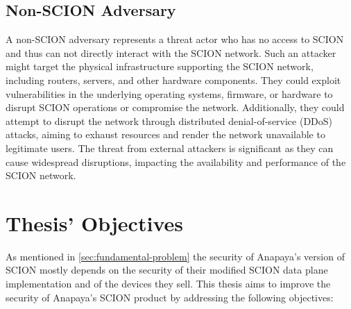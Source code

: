 \subsection{Non-SCION Adversary}
A non-SCION adversary represents a threat actor who has no access to SCION and thus can not directly interact with the SCION network.
Such an attacker might target the physical infrastructure supporting the SCION network, including routers, servers, and other hardware components.
They could exploit vulnerabilities in the underlying operating systems, firmware, or hardware to disrupt SCION operations or compromise the network.
Additionally, they could attempt to disrupt the network through distributed denial-of-service (DDoS) attacks, aiming to exhaust resources and render the network unavailable to legitimate users.
The threat from external attackers is significant as they can cause widespread disruptions, impacting the availability and performance of the SCION network.



\section{Thesis' Objectives}
As mentioned in \cref{sec:fundamental-problem} the security of Anapaya's version of SCION mostly depends on the security of their modified SCION data plane implementation and of the devices they sell.
This thesis aims to improve the security of Anapaya's SCION product by addressing the following objectives:

